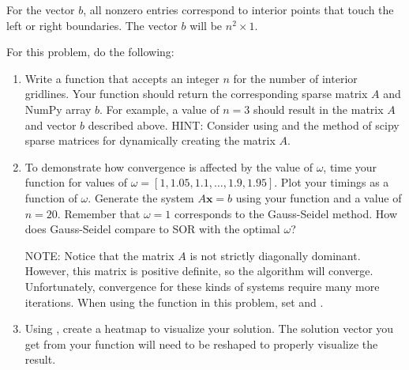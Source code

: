\begin{problem}
For the vector $b$, all nonzero entries correspond to interior points that touch the left or right boundaries. The vector $b$ will be $n^2 \times 1$.

For this problem, do the following:
\begin{enumerate}
    \item Write a function  that accepts an integer $n$ for the number of interior gridlines. Your function should return the corresponding sparse matrix $A$ and NumPy array $b$. For example, a value of $n = 3$ should result in the matrix $A$ and vector $b$ described above. HINT: Consider using  and the  method of scipy sparse matrices for dynamically creating the matrix $A$.
    \item To demonstrate how convergence is affected by the value of $\omega$, time your  function for values of $\omega = [1, 1.05, 1.1, \dots , 1.9, 1.95 ]$. Plot your timings as a function of $\omega$. Generate the system $A \mathbf{x} = b$ using your  function and a value of $n = 20$. Remember that $\omega = 1$ corresponds to the Gauss-Seidel method. How does Gauss-Seidel compare to SOR with the optimal $\omega$?

    NOTE: Notice that the matrix $A$ is not strictly diagonally dominant. However, this matrix is positive definite, so the algorithm will converge. Unfortunately, convergence for these kinds of systems require many more iterations. When using the  function in this problem, set  and .
    \item Using , create a heatmap to visualize your solution. The solution vector you get from your  function will need to be reshaped to properly visualize the result.
\end{enumerate}

\end{problem}

